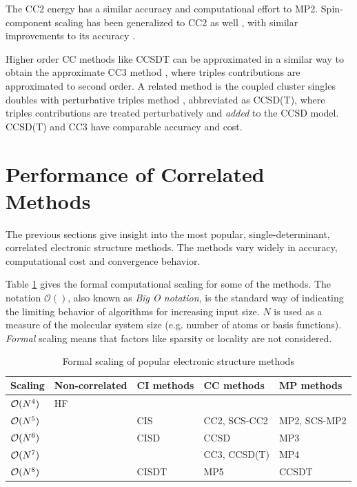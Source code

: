The CC2 energy has a similar accuracy and computational effort to MP2. Spin-component scaling has been generalized to CC2 as well \cite{Hel2008,Win2011}, with similar improvements to its accuracy \cite{Taj2019}. 

Higher order CC methods like CCSDT can be approximated in a similar way to obtain the approximate CC3 method \cite{Koc1997}, where triples contributions are approximated to second order. A related method is the coupled cluster singles doubles with perturbative triples method \cite{Rag1989}, abbreviated as CCSD(T), where triples contributions are treated perturbatively and \emph{added} to the CCSD model. CCSD(T) and CC3 have comparable accuracy and cost. 


\section{Performance of Correlated Methods}

The previous sections give insight into the most popular, single-determinant, correlated electronic structure methods. The methods vary widely in accuracy, computational cost and convergence behavior. 

Table \ref{tab:SCALINGS} gives the formal computational scaling for some of the methods. The notation $\mathcal{O}()$, also known as \emph{Big O notation}, is the standard way of indicating the limiting behavior of algorithms for increasing input size. $N$ is used as a measure of the molecular system size (e.g. number of atoms or basis functions). \emph{Formal} scaling means that factors like sparsity or locality are not considered.

\begin{table}
\centering
\begin{tabular}{lllll} 
\hline 
Scaling & Non-correlated & CI methods & CC methods & MP methods \\ \hline
$\mathcal{O}(N^{4})$ & HF &  &  &  \\
$\mathcal{O}(N^{5})$ & & CIS & CC2, SCS-CC2 & MP2, SCS-MP2 \\
$\mathcal{O}(N^{6})$ & & CISD & CCSD & MP3 \\
$\mathcal{O}(N^{7})$ & & & CC3, CCSD(T) & MP4 \\
$\mathcal{O}(N^{8})$ & & CISDT & MP5 & CCSDT \\
\hline 
\end{tabular}
\caption{Formal scaling of popular electronic structure methods}
\label{tab:SCALINGS}
\end{table}

